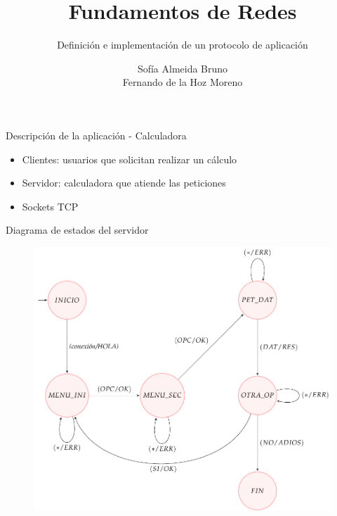\documentclass[spanish]{beamer}
\title{Fundamentos de Redes}
\subtitle{Definición e implementación de un protocolo de aplicación}
\author{Sofía Almeida Bruno\\ Fernando de la Hoz Moreno}
\begin{document}
\maketitle
\begin{frame}{Descripción de la aplicación - Calculadora}
	\begin{itemize}
		\item Clientes: usuarios que solicitan realizar un cálculo
		\item Servidor: calculadora que atiende las peticiones 
		\item Sockets TCP
\end{itemize}
	
	 

\end{frame}

\begin{frame}{Diagrama de estados del servidor}
	\begin{figure}[h]
		\centering
		\includegraphics[scale=0.55]{./diagrama}
	\end{figure}
\end{frame}
\end{document}
